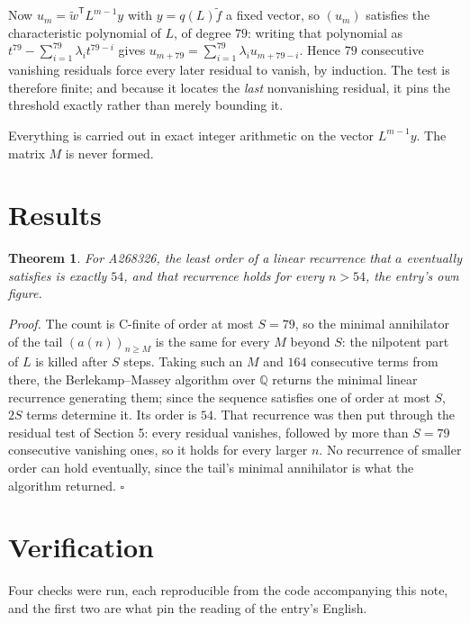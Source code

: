 \documentclass[11pt]{article}
\newtheorem{theorem}{Theorem}
\theoremstyle{definition}
\begin{document}
Now $u_m = \tilde w^{\mathsf T} L^{m-1} y$ with $y = q(L)\tilde f$ a fixed vector, so $(u_m)$ satisfies the characteristic polynomial of $L$, of degree $79$: writing that polynomial as $t^{79} - \sum_{i=1}^{79} \lambda_i t^{79-i}$ gives $u_{m+79} = \sum_{i=1}^{79} \lambda_i u_{m+79-i}$. Hence $79$ consecutive vanishing residuals force every later residual to vanish, by induction. The test is therefore finite; and because it locates the {\itshape last} nonvanishing residual, it pins the threshold exactly rather than merely bounding it.

Everything is carried out in exact integer arithmetic on the vector $L^{m-1}y$. The matrix $M$ is never formed.

\section{Results}

\begin{theorem} For A268326, the least order of a linear recurrence that $a$ eventually satisfies is exactly $54$, and that recurrence holds for every $n > 54$, the entry's own figure.\end{theorem}

{\itshape Proof.} The count is C-finite of order at most $S = 79$, so the minimal annihilator of the tail $(a(n))_{n \ge M}$ is the same for every $M$ beyond $S$: the nilpotent part of $L$ is killed after $S$ steps. Taking such an $M$ and $164$ consecutive terms from there, the Berlekamp--Massey algorithm over $\mathbb{Q}$ returns the minimal linear recurrence generating them; since the sequence satisfies one of order at most $S$, $2S$ terms determine it. Its order is $54$. That recurrence was then put through the residual test of Section 5: every residual vanishes, followed by more than $S = 79$ consecutive vanishing ones, so it holds for every larger $n$. No recurrence of smaller order can hold eventually, since the tail's minimal annihilator is what the algorithm returned. $\square$

\section{Verification}

Four checks were run, each reproducible from the code accompanying this note, and the first two are what pin the reading of the entry's English.
\end{document}
